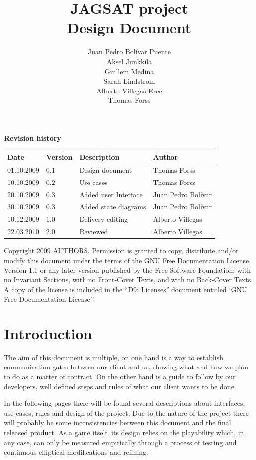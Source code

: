 \documentclass[12pt,a4paper]{article}
\title{\large JAGSAT project\\\huge Design Document}
\author{
  Juan Pedro Bolívar Puente\\ 
  Aksel Junkkila\\
  Guillem Medina\\ 
  Sarah Lindstrom\\ 
  Alberto Villegas Erce\\ 
  Thomas Forss
}
\let\stdsection\section
\renewcommand\section{\newpage\stdsection}
\begin{document}
\maketitle

\begin{center}
\textbf {Revision history}

\begin{tabular}{ l | l | l | l }
Date			&Version	&Description			&Author\\\hline\hline
01.10.2009	&0.1		&Design document		&Thomas Forss\\
10.10.2009	&0.2		&Use cases			&Thomas Forss\\
20.10.2009	&0.3		&Added user Interface	&Juan Pedro Bolívar\\
30.10.2009	&0.3		&Added state diagrams	&Juan Pedro Bolívar\\
10.12.2009	&1.0		&Delivery editing 		&Alberto Villegas\\
22.03.2010	&2.0		&Reviewed			&Alberto Villegas
\end{tabular}
\label{tab:rev}
\end{center}

\vfill
Copyright 2009 AUTHORS.
Permission is granted to copy, distribute and/or modify this document under the terms of the GNU Free Documentation License, Version 1.1 or any later version published by the Free Software Foundation;  with no Invariant Sections, with no Front-Cover Texts, and with no Back-Cover Texts. A copy of the license is included in the ``D9: Licenses''  document entitled `GNU Free Documentation License''.

\pagebreak
\tableofcontents
\pagebreak

\section{Introduction}

The aim of this document is multiple, on one hand is a way to establish 
communication gates between our client and us, showing what and how
we plan to do as a matter of contract. On the other hand is a guide to
follow by our developers, well defined steps and rules of what our
client wants to be done.
 
In the following pages there will be found several descriptions about 
interfaces, use cases, rules and design of the project. Due to the nature of 
the project there will probably be some inconsistencies between this
document and the final released product. As a game itself, its design
relies on the playability which, in any case, can only be measured
empirically through a process of testing and continuous elliptical
modifications and refining.
\end{document}
